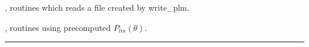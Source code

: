 \begin{related}
  \begin{sulist}{} %
  \item[\htmlref{read\_dbintab}{sub:read_dbintab}, \htmlref{read\_bintab}{sub:read_bintab}] routines which reads a file created by write\_plm. 
  \item[\htmlref{map2alm}{sub:map2alm}, \htmlref{alm2map}{sub:alm2map}] routines using precomputed $P_{lm}(\theta)$.
  \end{sulist}
\end{related}

\rule{\hsize}{2mm}

\newpage
